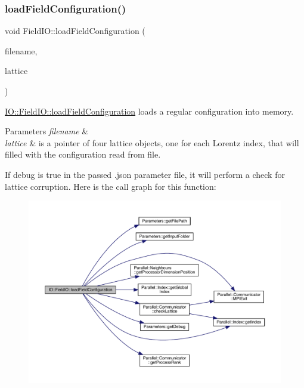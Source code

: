 \subsubsection{\texorpdfstring{loadFieldConfiguration()}{loadFieldConfiguration()}}
{\footnotesize\ttfamily void Field\+I\+O\+::load\+Field\+Configuration (\begin{DoxyParamCaption}\item[{std\+::string}]{filename,  }\item[{\mbox{\hyperlink{class_lattice}{Lattice}}$<$ \mbox{\hyperlink{class_s_u3}{S\+U3}} $>$ $\ast$}]{lattice }\end{DoxyParamCaption})\hspace{0.3cm}{\ttfamily [static]}}



\mbox{\hyperlink{class_i_o_1_1_field_i_o_a02db864a48601edd7febaab5d655e495}{I\+O\+::\+Field\+I\+O\+::load\+Field\+Configuration}} loads a regular configuration into memory. 


\begin{DoxyParams}{Parameters}
{\em filename} & \\
\hline
{\em lattice} & is a pointer of four lattice objects, one for each Lorentz index, that will filled with the configuration read from file.\\
\hline
\end{DoxyParams}
If debug is true in the passed .json parameter file, it will perform a check for lattice corruption. Here is the call graph for this function\+:\nopagebreak
\begin{figure}[H]
\begin{center}
\leavevmode
\includegraphics[width=350pt]{class_i_o_1_1_field_i_o_a02db864a48601edd7febaab5d655e495_cgraph}
\end{center}
\end{figure}
\mbox{\label{class_i_o_1_1_field_i_o_aaf2bac2025d67c06e7c61e8cc9f44777}} 
